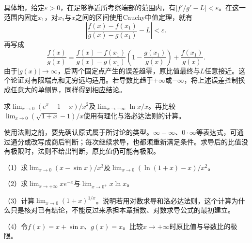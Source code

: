 具体地，给定\(\varepsilon>0\)，在足够靠近所考察端部的范围内，有\(|f'/g'-L|<\varepsilon\)。在这一范围内固定\(x_1\)，对\(x_1\)与\(x\)之间的区间使用Cauchy中值定理，就有
\begin{equation*}
 \left|\frac{f(x)-f(x_1)}{g(x)-g(x_1)}-L\right|<\varepsilon.
\end{equation*}
再写成
\begin{equation*}
 \frac{f(x)}{g(x)}=
 \frac{f(x)-f(x_1)}{g(x)-g(x_1)}
 \left(1-\frac{g(x_1)}{g(x)}\right)+\frac{f(x_1)}{g(x)}.
\end{equation*}
由于\(|g(x)|\to\infty\)，后两个固定点产生的误差趋零，原比值最终与\(L\)任意接近。这个论证对有限端点和无穷远均适用。若导数比趋于\(+\infty\)或\(-\infty\)，将上述误差控制换成任意大的单侧界，同样得到相应结论。

\begin{example}
求\(\lim_{x\to0}(e^x-1-x)/x^2\)及\(\lim_{x\to+\infty}\ln x/x\)。再比较\(\lim_{x\to0}(\sqrt{1+x}-1)/x\)使用有理化与洛必达法则的计算。
\end{example}

使用法则之前，要先确认原式属于所讨论的类型。\(\infty-\infty\)、\(0\cdot\infty\)等表达式，可通过通分或改写成商后判断；每次继续求导，也都须重新满足条件。求导后的比值没有极限时，法则不给出判断，原比值仍可能有极限。

\begin{exercise}
\mbox{}\par\nobreak

（1）求\(\lim_{x\to0}(x-\sin x)/x^3\)及\(\lim_{x\to0}(\ln(1+x)-x)/x^2\)。

（2）求\(\lim_{x\to+\infty}x e^{-x}\)与\(\lim_{x\to0^+}x\ln x\)。

（3）计算\(\lim_{x\to0}(1+x)^{1/x}\)。说明若用对数求导和洛必达法则，这个计算为什么只是核对已有结论，不能反过来承担本章指数、对数求导公式的最初建立。

（4）令\(f(x)=x+\sin x\)、\(g(x)=x\)。比较\(x\to+\infty\)时原比值与导数比的极限。
\end{exercise}
\endgroup
